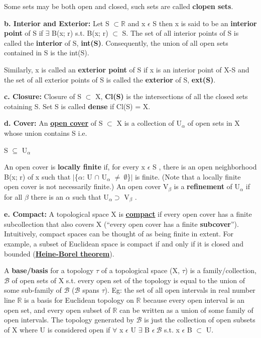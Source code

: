 Some sets may be both open and closed, such sets are called \textbf{clopen sets}.

\textbf{b. Interior and Exterior: } Let S $\subset \mathbb{R}$ and x $\epsilon$ S then x is said to be an \textbf{interior point} of S if 
$\exists$ B(x; r) s.t. B(x; r) $\subset$ S. The set of all interior points of S is called the \textbf{interior} of S, \textbf{int(S)}.
Consequently, the union of all open sets contained in S is the int(S).

Similarly, x is called an \textbf{exterior point} of S if x is an interior point of X-S and the set of all exterior points of S
is called the \textbf{exterior} of S, \textbf{ext(S)}.

\textbf{c. Closure: } Closure of S $\subset$ X, \textbf{Cl(S)} is the intersections of all the closed sets cotaining S.
Set S is called \textbf{dense} if Cl(S) = X.

\textbf{d. Cover: } An \href{https://en.wikipedia.org/wiki/Cover_(topology)}{\textbf{open cover}} of S $\subset$ X is a collection of {U$_\alpha$} of open sets in X
whose union contains S i.e.
\begin{center}
    S $\subseteq$ U$_\alpha$
\end{center}
An open cover is \textbf{locally finite} if, for every x $\epsilon$ S , there is an open neighborhood B(x; r) of x
such that $\lvert$\{$\alpha$: U $\cap$ U$_\alpha$ $\neq \: \emptyset $\}$\rvert$ is finite. (Note that a locally finite open cover is not
necessarily finite.) An open cover {V$_\beta$ } is a \textbf{refinement} of {U$_\alpha$} if for all $\beta$ there is
an $\alpha$ such that U$_\alpha \supset$ V$_\beta$ .

\textbf{e. Compact: } A topological space X is \href{https://blogs.scientificamerican.com/roots-of-unity/what-does-compactness-really-mean/}{\textbf{compact}}
if every open cover has a finite subcollection that also covers X (“every open cover has a finite \textbf{subcover}”). 
Intuitively, compact spaces can be thought of as being finite in extent. 
For example, a subset of Euclidean space is compact if and only if it is closed and
bounded (\href{https://en.wikipedia.org/wiki/Heine%E2%80%93Borel_theorem}{\textbf{Heine-Borel theorem}}).

A \textbf{base/basis} for a topology $\tau$ of a topological space (X, $\tau$) is a family/collection, $\mathcal{B}$ of 
open sets of X s.t. every open set of the topology is equal to the union of some sub-family of $\mathcal{B}$ ($\mathcal{B}$ spans $\tau$).
Eg: the set of all open intervals in real number line $\mathbb{R}$ is a basis for Euclidean topology on $\mathbb{R}$ because every open
interval is an open set, and every open subset of $\mathbb{R}$ can be written as a union of some family of open intervals. The topology generated by $\mathcal{B}$ is just the collection of  open subsets of X where U is considered open
if $\forall$ x $\epsilon$ U $\exists$ B $\epsilon \: \mathcal{B}$ s.t. x $\epsilon$ B $\subset$ U.

